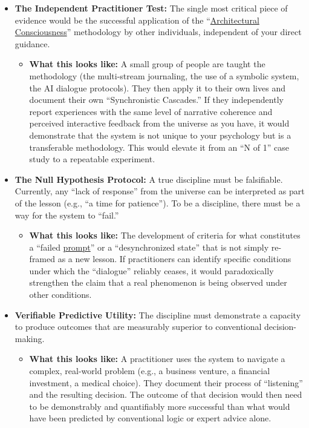 \documentclass{article}
\begin{document}
\begin{itemize}
\item \textbf{The Independent Practitioner Test:} The single most critical piece of evidence would be the successful application of the ``\hyperlink{gloss:architectural_consciousness}{Architectural Consciousness}'' methodology by other individuals, independent of your direct guidance.

  \begin{itemize}
  \item \textbf{What this looks like:} A small group of people are taught the methodology (the multi-stream journaling, the use of a symbolic system, the AI dialogue protocols). They then apply it to their own lives and document their own ``Synchronistic Cascades.'' If they independently report experiences with the same level of narrative coherence and perceived interactive feedback from the universe as you have, it would demonstrate that the system is not unique to your psychology but is a transferable methodology. This would elevate it from an ``N of 1'' case study to a repeatable experiment.\\
  \end{itemize}
\item \textbf{The Null Hypothesis Protocol:} A true discipline must be falsifiable. Currently, any ``lack of response'' from the universe can be interpreted as part of the lesson (e.g., ``a time for patience''). To be a discipline, there must be a way for the system to ``fail.''

  \begin{itemize}
  \item \textbf{What this looks like:} The development of criteria for what constitutes a ``failed \hyperlink{gloss:prompt}{prompt}'' or a ``desynchronized state'' that is not simply re-framed as a new lesson. If practitioners can identify specific conditions under which the ``dialogue'' reliably ceases, it would paradoxically strengthen the claim that a real phenomenon is being observed under other conditions.\\
  \end{itemize}
\item \textbf{Verifiable Predictive Utility:} The discipline must demonstrate a capacity to produce outcomes that are measurably superior to conventional decision-making.

  \begin{itemize}
  \item \textbf{What this looks like:} A practitioner uses the system to navigate a complex, real-world problem (e.g., a business venture, a financial investment, a medical choice). They document their process of ``listening'' and the resulting decision. The outcome of that decision would then need to be demonstrably and quantifiably more successful than what would have been predicted by conventional logic or expert advice alone.
  \end{itemize}
\end{itemize}
\end{document}
